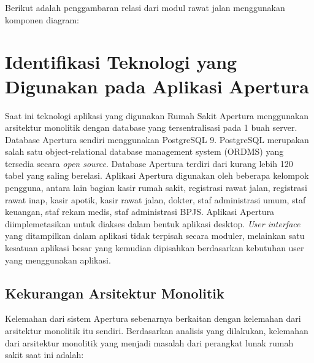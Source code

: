 Berikut adalah penggambaran relasi dari modul rawat jalan menggunakan komponen diagram:

\begin{adjustbox}{width=1\textwidth}
	\begin{minipage}{\linewidth}
	\end{minipage}
\end{adjustbox}

\section{Identifikasi Teknologi yang Digunakan pada Aplikasi Apertura}
Saat ini teknologi aplikasi yang digunakan Rumah Sakit Apertura menggunakan arsitektur monolitik dengan database yang tersentralisasi pada 1 buah server. Database Apertura sendiri menggunakan PostgreSQL 9. PostgreSQL merupakan salah satu object-relational database management system (ORDMS) yang tersedia secara \textit{open source}. Database Apertura terdiri dari kurang lebih 120 tabel yang saling berelasi. Aplikasi Apertura digunakan oleh beberapa kelompok pengguna, antara lain bagian kasir rumah sakit, registrasi rawat jalan, registrasi rawat inap, kasir apotik, kasir rawat jalan, dokter, staf administrasi umum, staf keuangan, staf rekam medis, staf administrasi BPJS.
Aplikasi Apertura diimplemetasikan untuk diakses dalam bentuk aplikasi desktop. \textit{User interface} yang ditampilkan dalam aplikasi tidak terpisah secara moduler, melainkan satu kesatuan aplikasi besar yang kemudian dipisahkan berdasarkan kebutuhan user yang menggunakan aplikasi.

\subsection{Kekurangan Arsitektur Monolitik}
Kelemahan dari sistem Apertura sebenarnya berkaitan dengan kelemahan dari arsitektur monolitik itu sendiri. Berdasarkan analisis yang dilakukan, kelemahan dari arsitektur monolitik yang menjadi masalah dari perangkat lunak rumah sakit saat ini adalah:

